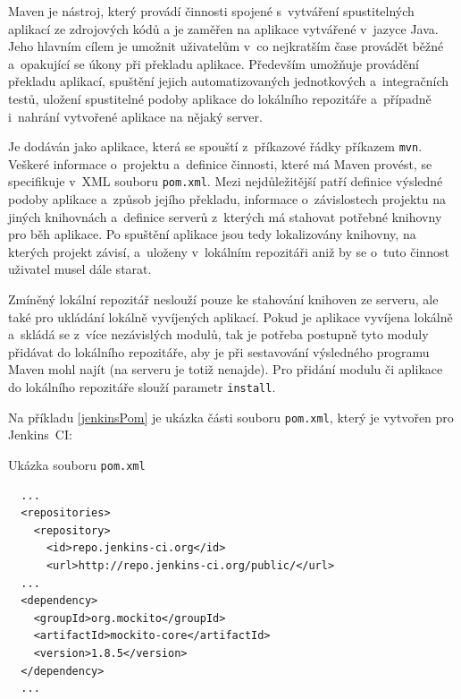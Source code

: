         Maven je nástroj, který provádí činnosti spojené s~vytváření spustitelných aplikací ze zdrojových kódů
        a je zaměřen na aplikace vytvářené v~jazyce Java. Jeho hlavním cílem je umožnit uživatelům v~co nejkratším
        čase provádět běžné a~opakující se úkony při překladu aplikace. Především umožňuje
        provádění překladu aplikací, spuštění jejich automatizovaných jednotkových
        a~integračních testů, uložení spustitelné podoby aplikace do lokálního repozitáře 
        a~případně i~nahrání vytvořené aplikace na nějaký server. 

        Je dodáván jako aplikace, která se spouští z~příkazové řádky příkazem \texttt{mvn}. Veškeré
        informace o~projektu a~definice činnosti, které má Maven provést, se specifikuje 
        v~XML souboru \texttt{pom.xml}. Mezi nejdůležitější patří definice výsledné podoby aplikace
        a~způsob jejího překladu, informace o~závislostech
        projektu na jiných knihovnách a~definice serverů z~kterých má stahovat potřebné knihovny pro běh aplikace. 
        Po spuštění aplikace jsou tedy lokalizovány knihovny, na kterých projekt
        závisí, a~uloženy v~lokálním repozitáři aniž by se o~tuto činnost uživatel musel dále starat.

        Zmíněný lokální repozitář neslouží pouze ke stahování knihoven ze serveru, ale
        také pro ukládání lokálně vyvíjených aplikací.
        Pokud je aplikace vyvíjena lokálně a~skládá se z~více nezávislých modulů, tak je potřeba
        postupně tyto moduly přidávat do lokálního repozitáře, aby je při sestavování
        výsledného programu Maven mohl najít (na serveru je totiž nenajde). Pro přidání modulu či aplikace do 
        lokálního repozitáře slouží parametr \texttt{install}.


        Na příkladu \ref{jenkinsPom} je ukázka části souboru \texttt{pom.xml}, který je vytvořen pro Jenkins~CI:
        
        \newpage
        \begin{priklad} \label{jenkinsPom} 
            Ukázka souboru \texttt{pom.xml}
\begin{verbatim}
  ...
  <repositories>
    <repository>
      <id>repo.jenkins-ci.org</id>
      <url>http://repo.jenkins-ci.org/public/</url>
  ...
  <dependency>
    <groupId>org.mockito</groupId>
    <artifactId>mockito-core</artifactId>
    <version>1.8.5</version>
  </dependency>
  ...
\end{verbatim}
        \end{priklad}

